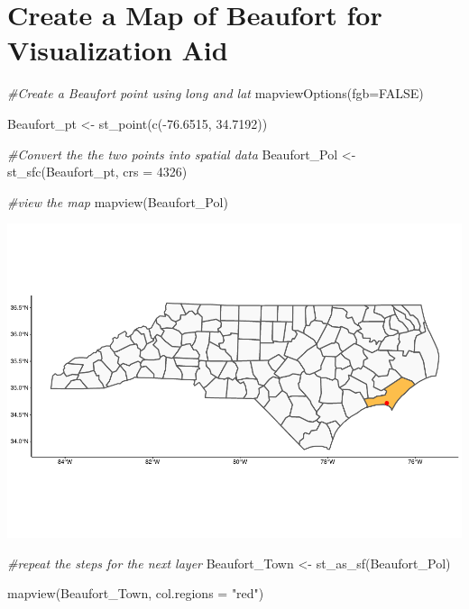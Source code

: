 \documentclass[
  12pt,
]{article}
\newenvironment{Shaded}{\begin{snugshade}}{\end{snugshade}}
\newcommand{\AttributeTok}[1]{\textcolor[rgb]{0.77,0.63,0.00}{#1}}
\newcommand{\CommentTok}[1]{\textcolor[rgb]{0.56,0.35,0.01}{\textit{#1}}}
\newcommand{\ConstantTok}[1]{\textcolor[rgb]{0.00,0.00,0.00}{#1}}
\newcommand{\DecValTok}[1]{\textcolor[rgb]{0.00,0.00,0.81}{#1}}
\newcommand{\FloatTok}[1]{\textcolor[rgb]{0.00,0.00,0.81}{#1}}
\newcommand{\FunctionTok}[1]{\textcolor[rgb]{0.00,0.00,0.00}{#1}}
\newcommand{\NormalTok}[1]{#1}
\newcommand{\OtherTok}[1]{\textcolor[rgb]{0.56,0.35,0.01}{#1}}
\newcommand{\SpecialCharTok}[1]{\textcolor[rgb]{0.00,0.00,0.00}{#1}}
\newcommand{\StringTok}[1]{\textcolor[rgb]{0.31,0.60,0.02}{#1}}
\begin{document}
\hypertarget{create-a-map-of-beaufort-for-visualization-aid}{%
\section{Create a Map of Beaufort for Visualization
Aid}\label{create-a-map-of-beaufort-for-visualization-aid}}

\begin{Shaded}
\begin{Highlighting}[]
\CommentTok{\#Create a Beaufort point using long and lat }
\FunctionTok{mapviewOptions}\NormalTok{(}\AttributeTok{fgb=}\ConstantTok{FALSE}\NormalTok{)}

\NormalTok{Beaufort\_pt }\OtherTok{\textless{}{-}}  \FunctionTok{st\_point}\NormalTok{(}\FunctionTok{c}\NormalTok{(}\SpecialCharTok{{-}}\FloatTok{76.6515}\NormalTok{, }\FloatTok{34.7192}\NormalTok{))}

\CommentTok{\#Convert the the two points into spatial data}
\NormalTok{Beaufort\_Pol }\OtherTok{\textless{}{-}} \FunctionTok{st\_sfc}\NormalTok{(Beaufort\_pt, }\AttributeTok{crs =} \DecValTok{4326}\NormalTok{)}

\CommentTok{\#view the map}
\FunctionTok{mapview}\NormalTok{(Beaufort\_Pol)}
\end{Highlighting}
\end{Shaded}

\includegraphics{Project_Template_TLK_files/figure-latex/Map of Beaufort-1.pdf}

\begin{Shaded}
\begin{Highlighting}[]
\CommentTok{\#repeat the steps for the next layer}
\NormalTok{Beaufort\_Town }\OtherTok{\textless{}{-}} \FunctionTok{st\_as\_sf}\NormalTok{(Beaufort\_Pol)}

\FunctionTok{mapview}\NormalTok{(Beaufort\_Town, }\AttributeTok{col.regions =} \StringTok{"red"}\NormalTok{)}
\end{Highlighting}
\end{Shaded}
\end{document}
